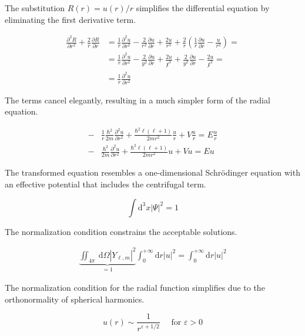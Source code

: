 \documentclass[italian]{HKNdocument}
\begin{document}
The substitution $R(r) = u(r)/r$ simplifies the differential equation by eliminating the first derivative term.

\begin{align}
\frac{\partial^{2} R}{\partial r^{2}}+\frac{2}{r} \frac{\partial R}{\partial r} & =\frac{1}{r} \frac{\partial^{2} u}{\partial r^{2}}-\frac{2}{r^{2}} \frac{\partial u}{\partial r}+\frac{2 u}{r^{3}}+\frac{2}{r}\left(\frac{1}{r} \frac{\partial u}{\partial r}-\frac{u}{r^{2}}\right)= \\
& =\frac{1}{r} \frac{\partial^{2} u}{\partial r^{2}}-\frac{2}{y^{2}} \frac{\partial u}{\partial r}+\frac{2 u}{\not r^{3}}+\frac{2}{y^{2}} \frac{\partial u}{\partial r}-\frac{2 u}{\not r^{3}}=  \label{eq:9.35}\\
& =\frac{1}{r} \frac{\partial^{2} u}{\partial r^{2}}
\end{align}

The terms cancel elegantly, resulting in a much simpler form of the radial equation.

\begin{align}
- & \frac{1}{r} \frac{\hbar^{2}}{2 m} \frac{\partial^{2} u}{\partial r^{2}}+\frac{\hbar^{2} \ell(\ell+1)}{2 m r^{2}} \frac{u}{r}+V \frac{u}{r}=E \frac{u}{r}  \label{eq:9.36}\\
- & \frac{\hbar^{2}}{2 m} \frac{\partial^{2} u}{\partial r^{2}}+\frac{\hbar^{2} \ell(\ell+1)}{2 m r^{2}} u+V u=E u
\end{align}

The transformed equation resembles a one-dimensional Schrödinger equation with an effective potential that includes the centrifugal term.

\begin{equation}
\int \mathrm{d}^{3} x|\Psi|^{2}=1 \label{eq:9.37}
\end{equation}

The normalization condition constrains the acceptable solutions.

\begin{align}
\underbrace{\iint_{4 \pi} \mathrm{~d} \Omega\left|Y_{\ell, m}\right|^{2}}_{=1} \int_{0}^{+\infty} \mathrm{d} r |u|^{2} = \int_{0}^{+\infty} \mathrm{d} r|u|^{2} \label{eq:9.38}
\end{align}

The normalization condition for the radial function simplifies due to the orthonormality of spherical harmonics.

\begin{equation}
u(r) \sim \frac{1}{r^{\varepsilon+1 / 2}} \quad \text { for } \varepsilon>0 \label{eq:9.39}
\end{equation}
\end{document}

